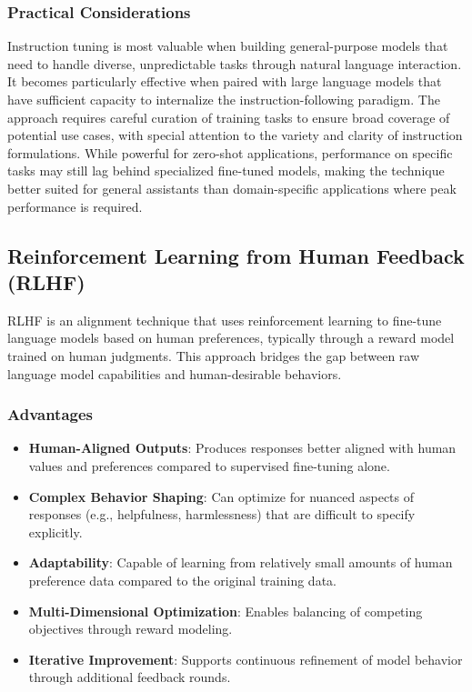 \subsubsection{Practical Considerations}
Instruction tuning is most valuable when building general-purpose models that need to handle diverse, unpredictable tasks through natural language interaction. It becomes particularly effective when paired with large language models that have sufficient capacity to internalize the instruction-following paradigm. The approach requires careful curation of training tasks to ensure broad coverage of potential use cases, with special attention to the variety and clarity of instruction formulations. While powerful for zero-shot applications, performance on specific tasks may still lag behind specialized fine-tuned models, making the technique better suited for general assistants than domain-specific applications where peak performance is required.

\subsection{Reinforcement Learning from Human Feedback (RLHF)}

RLHF is an alignment technique that uses reinforcement learning to fine-tune language models based on human preferences, typically through a reward model trained on human judgments. This approach bridges the gap between raw language model capabilities and human-desirable behaviors.

\subsubsection{Advantages}
\begin{itemize}
    \item \textbf{Human-Aligned Outputs}: Produces responses better aligned with human values and preferences compared to supervised fine-tuning alone.
    
    \item \textbf{Complex Behavior Shaping}: Can optimize for nuanced aspects of responses (e.g., helpfulness, harmlessness) that are difficult to specify explicitly.
    
    \item \textbf{Adaptability}: Capable of learning from relatively small amounts of human preference data compared to the original training data.
    
    \item \textbf{Multi-Dimensional Optimization}: Enables balancing of competing objectives through reward modeling.
    
    \item \textbf{Iterative Improvement}: Supports continuous refinement of model behavior through additional feedback rounds.
\end{itemize}

